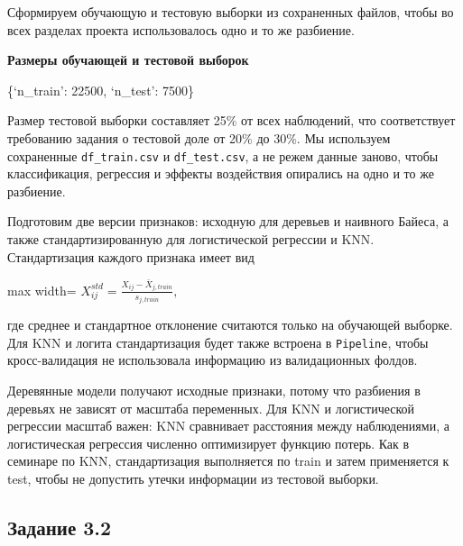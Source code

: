 \documentclass[11pt]{article}
\begin{document}
    Сформируем обучающую и тестовую выборки из сохраненных файлов, чтобы во
всех разделах проекта использовалось одно и то же разбиение.

    \textbf{Размеры обучающей и тестовой выборок}

\{`n\_train': 22500, `n\_test': 7500\}

    Размер тестовой выборки составляет 25\% от всех наблюдений, что
соответствует требованию задания о тестовой доле от 20\% до 30\%. Мы
используем сохраненные \texttt{df\_train.csv} и \texttt{df\_test.csv}, а
не режем данные заново, чтобы классификация, регрессия и эффекты
воздействия опирались на одно и то же разбиение.

    Подготовим две версии признаков: исходную для деревьев и наивного
Байеса, а также стандартизированную для логистической регрессии и KNN.
Стандартизация каждого признака имеет вид

\begin{center}
\begin{adjustbox}{max width=\linewidth}
\(\displaystyle X^{std}_{ij} = \frac{X_{ij} - \bar X_{j, train}}{s_{j, train}},\)
\end{adjustbox}
\end{center}

где среднее и стандартное отклонение считаются только на обучающей
выборке. Для KNN и логита стандартизация будет также встроена в
\texttt{Pipeline}, чтобы кросс-валидация не использовала информацию из
валидационных фолдов.

    Деревянные модели получают исходные признаки, потому что разбиения в
деревьях не зависят от масштаба переменных. Для KNN и логистической
регрессии масштаб важен: KNN сравнивает расстояния между наблюдениями, а
логистическая регрессия численно оптимизирует функцию потерь. Как в
семинаре по KNN, стандартизация выполняется по train и затем применяется
к test, чтобы не допустить утечки информации из тестовой выборки.

    \subsection{Задание 3.2}\label{ux437ux430ux434ux430ux43dux438ux435-3.2}
\end{document}
